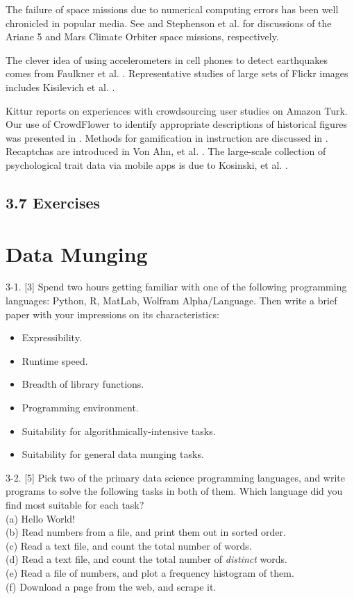 \documentclass[10pt]{article}
\begin{document}
The failure of space missions due to numerical computing errors has been well chronicled in popular media. See \cite{Gle96} and Stephenson et al. \cite{SMB+99} for discussions of the Ariane 5 and Mars Climate Orbiter space missions, respectively.

The clever idea of using accelerometers in cell phones to detect earthquakes comes from Faulkner et al. \cite{FCH+14}. Representative studies of large sets of Flickr images includes Kisilevich et al. \cite{KKK+10}.

Kittur \cite{KCS08} reports on experiences with crowdsourcing user studies on Amazon Turk. Our use of CrowdFlower to identify appropriate descriptions of historical figures was presented in \cite{CPS15}. Methods for gamification in instruction are discussed in \cite{DDKN11, Kap12}. Recaptchas are introduced in Von Ahn, et al. \cite{VAMM+08}. The large-scale collection of psychological trait data via mobile apps is due to Kosinski, et al. \cite{KSG13}.

\subsection*{3.7 Exercises}
\section*{Data Munging}
3-1. [3] Spend two hours getting familiar with one of the following programming languages: Python, R, MatLab, Wolfram Alpha/Language. Then write a brief paper with your impressions on its characteristics:

\begin{itemize}
  \item Expressibility.
  \item Runtime speed.
  \item Breadth of library functions.
  \item Programming environment.
  \item Suitability for algorithmically-intensive tasks.
  \item Suitability for general data munging tasks.
\end{itemize}

3-2. [5] Pick two of the primary data science programming languages, and write programs to solve the following tasks in both of them. Which language did you find most suitable for each task?\\
(a) Hello World!\\
(b) Read numbers from a file, and print them out in sorted order.\\
(c) Read a text file, and count the total number of words.\\
(d) Read a text file, and count the total number of \textit{distinct} words.\\
(e) Read a file of numbers, and plot a frequency histogram of them.\\
(f) Download a page from the web, and scrape it.
\end{document}
